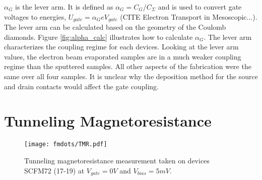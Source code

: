 
$\alpha_{G}$ is the lever arm. It is defined as $\alpha_{G} = C_G/C_{\Sigma}$ and is used to convert gate voltages to energies, $U_{gate} = \alpha_{G}eV_{gate}$ (CITE Electron Transport in Mesoscopic...). The lever arm can be calculated based on the geometry of the Coulomb diamonds. Figure \ref{fig:alpha_calc} illustrates how to calculate $\alpha_{G}$. The lever arm characterizes the coupling regime for each devices. Looking at the lever arm values, the electron beam evaporated samples are in a much weaker coupling regime than the sputtered samples. All other aspects of the fabrication were the same over all four samples. It is unclear why the deposition method for the source and drain contacts would affect the gate coupling. 

\section{Tunneling Magnetoresistance}

\begin{figure}
    \centering
    \texttt{[image: fmdots/TMR.pdf]}
    \caption{Tunneling magnetoresistance measurement taken on devices SCFM72 (17-19) at $V_{gate} = 0V$ and $V_{bias} = 5mV$.}
    \label{fig:TMR_real}
\end{figure}

